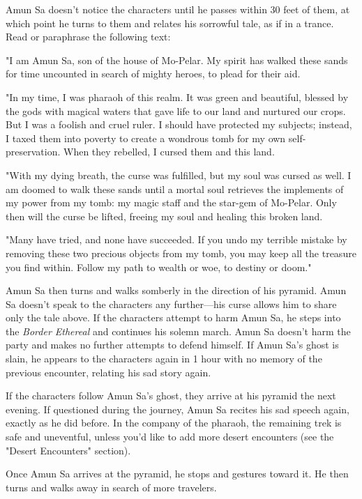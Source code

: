 \documentclass[10pt,a4paper,twoside,bg=print,twocolumn,openany,nodeprecatedcode]{dndbook}
\begin{document}
Amun Sa doesn't notice the characters until he passes within 30 feet of them, at which point he turns to them and relates his sorrowful tale, as if in a trance. Read or paraphrase the following text:

\begin{DndReadAloud}{}
"I am Amun Sa, son of the house of Mo-Pelar. My spirit has walked these sands for time uncounted in search of mighty heroes, to plead for their aid.

"In my time, I was pharaoh of this realm. It was green and beautiful, blessed by the gods with magical waters that gave life to our land and nurtured our crops. But I was a foolish and cruel ruler. I should have protected my subjects; instead, I taxed them into poverty to create a wondrous tomb for my own self-preservation. When they rebelled, I cursed them and this land.

"With my dying breath, the curse was fulfilled, but my soul was cursed as well. I am doomed to walk these sands until a mortal soul retrieves the implements of my power from my tomb: my magic staff and the star-gem of Mo-Pelar. Only then will the curse be lifted, freeing my soul and healing this broken land.

"Many have tried, and none have succeeded. If you undo my terrible mistake by removing these two precious objects from my tomb, you may keep all the treasure you find within. Follow my path to wealth or woe, to destiny or doom."

\end{DndReadAloud}

Amun Sa then turns and walks somberly in the direction of his pyramid. Amun Sa doesn't speak to the characters any further—his curse allows him to share only the tale above. If the characters attempt to harm Amun Sa, he steps into the \textit{Border Ethereal} and continues his solemn march. Amun Sa doesn't harm the party and makes no further attempts to defend himself. If Amun Sa's ghost is slain, he appears to the characters again in 1 hour with no memory of the previous encounter, relating his sad story again.

If the characters follow Amun Sa's ghost, they arrive at his pyramid the next evening. If questioned during the journey, Amun Sa recites his sad speech again, exactly as he did before. In the company of the pharaoh, the remaining trek is safe and uneventful, unless you'd like to add more desert encounters (see the "Desert Encounters" section).

Once Amun Sa arrives at the pyramid, he stops and gestures toward it. He then turns and walks away in search of more travelers.
\end{document}
